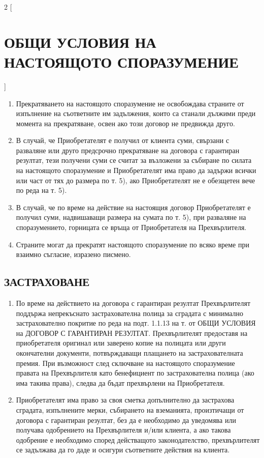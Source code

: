 \begin{multicols}{2} [\section{ОБЩИ УСЛОВИЯ НА НАСТОЯЩОТО
    СПОРАЗУМЕНИЕ}]
\begin{enumerate}
  \item Прекратяването на настоящото споразумение не освобождава
    страните от изпълнение на съответните им задължения, които са
    станали дължими преди момента на прекратяване, освен ако този
    договор не предвижда друго.
  \item В случай, че Приобретателят е получил от клиента суми,
    свързани с разваляне или друго предсрочно прекратяване на договора
    с гарантиран резултат, тези получени суми се считат за възложени
    за събиране по силата на настоящото споразумение и Приобретателят
    има право да задържи всички или част от тях до размера по т. 5),
    ако Приобретателят не е обезщетен вече по реда на т. 5).
  \item В случай, че по време на действие на настоящия договор
    Приобретателят е получил суми, надвишаващи размера на сумата по
    т. 5), при разваляне на споразумението, горницата се връща от
    Приобретателя на Прехвърлителя.
  \item Страните могат да прекратят настоящото споразумение по всяко
    време при взаимно съгласие, изразено писмено.
  \end{enumerate}

  \subsection{ЗАСТРАХОВАНЕ}
  \begin{enumerate}
  \item По време на действието на договора с гарантиран резултат
    Прехвърлителят поддържа непрекъснато застрахователна полица за
    сградата с минимално застрахователно покритие по реда на
    подт. 1.1.13 на т.  от ОБЩИ УСЛОВИЯ на ДОГОВОР С ГАРАНТИРАН
    РЕЗУЛТАТ. Прехвърлителят предоставя на приобретателя оригинал или
    заверено копие на полицата или други окончателни документи,
    потвърждаващи плащането на застрахователната премия. При
    възможност след сключване на настоящото споразумение правата на
    Прехвърлителя като бенефициент по застрахователна полица (ако има
    такива права), следва да бъдат прехвърлени на Приобретателя.
  \item Приобретателят има право за своя сметка допълнително да
    застрахова сградата, изпълнените мерки, събирането на вземанията,
    произтичащи от договора с гарантиран резултат, без да е необходимо
    да уведомява или получава одобрението на Прехвърлителя и/или
    клиента, а ако такова одобрение е необходимо според действащото
    законодателство, прехвърлителят се задължава да го даде и осигури
    съответните действия на клиента.
  \end{enumerate}


\end{multicols}
